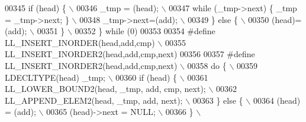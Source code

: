 \begin{DoxyCode}
00345 \textcolor{preprocessor}{  if (head) \{                                                                                  \(\backslash\)}
00346 \textcolor{preprocessor}{    \_tmp = (head);                                                                             \(\backslash\)}
00347 \textcolor{preprocessor}{    while (\_tmp->next) \{ \_tmp = \_tmp->next; \}                                                  \(\backslash\)}
00348 \textcolor{preprocessor}{    \_tmp->next=(add);                                                                          \(\backslash\)}
00349 \textcolor{preprocessor}{  \} else \{                                                                                     \(\backslash\)}
00350 \textcolor{preprocessor}{    (head)=(add);                                                                              \(\backslash\)}
00351 \textcolor{preprocessor}{  \}                                                                                            \(\backslash\)}
00352 \textcolor{preprocessor}{\} while (0)}
00353 
00354 \textcolor{preprocessor}{#define LL\_INSERT\_INORDER(head,add,cmp)                                                        \(\backslash\)}
00355 \textcolor{preprocessor}{    LL\_INSERT\_INORDER2(head,add,cmp,next)}
00356 
00357 \textcolor{preprocessor}{#define LL\_INSERT\_INORDER2(head,add,cmp,next)                                                  \(\backslash\)}
00358 \textcolor{preprocessor}{do \{                                                                                           \(\backslash\)}
00359 \textcolor{preprocessor}{  LDECLTYPE(head) \_tmp;                                                                        \(\backslash\)}
00360 \textcolor{preprocessor}{  if (head) \{                                                                                  \(\backslash\)}
00361 \textcolor{preprocessor}{    LL\_LOWER\_BOUND2(head, \_tmp, add, cmp, next);                                               \(\backslash\)}
00362 \textcolor{preprocessor}{    LL\_APPEND\_ELEM2(head, \_tmp, add, next);                                                    \(\backslash\)}
00363 \textcolor{preprocessor}{  \} else \{                                                                                     \(\backslash\)}
00364 \textcolor{preprocessor}{    (head) = (add);                                                                            \(\backslash\)}
00365 \textcolor{preprocessor}{    (head)->next = NULL;                                                                       \(\backslash\)}
00366 \textcolor{preprocessor}{  \}                                                                                            \(\backslash\)}

\end{DoxyCode}
